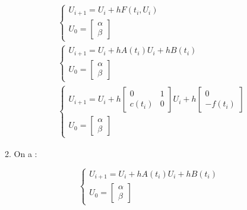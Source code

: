 \documentclass[12pt, letterpaper]{article}
\begin{document}
\begin{enumerate}
\begin{enumerate}
    \begin{equation*}
      \begin{split}
        &
        \left\{
        \begin{array}{l}
          U_{i+1} = U_i + h F(t_i, U_i) \\
          U_0 =
          \left[
            \begin{array}{l}
              \alpha \\
              \beta
            \end{array}
            \right]
        \end{array}
        \right.
        \\
        &
        \left\{
        \begin{array}{l}
          U_{i+1} = U_i + h A(t_i) U_i + h B(t_i) \\
          U_0 =
          \left[
            \begin{array}{l}
              \alpha \\
              \beta
            \end{array}
            \right]
        \end{array}
        \right.
        \\
        &
        \left\{
        \begin{array}{l}
          U_{i+1} = U_i + h
          \left[
            \begin{array}{ll}
              0 & 1 \\
              c(t_i) & 0
            \end{array}
            \right]
          U_i + h
          \left[
            \begin{array}{l}
              0 \\
              - f(t_i)
            \end{array}
            \right] \\
          U_0 =
          \left[
            \begin{array}{l}
              \alpha \\
              \beta
            \end{array}
            \right]
        \end{array}
        \right.
      \end{split}
    \end{equation*}

  \item
    On a :

    \begin{equation*}
      \left\{
      \begin{array}{l}
        U_{i+1} = U_i + h A(t_i) U_i + h B(t_i) \\
        U_0 =
        \left[
          \begin{array}{l}
            \alpha \\
            \beta
          \end{array}
          \right]
      \end{array}
      \right.
    \end{equation*}


\end{enumerate}
\end{enumerate}
\end{document}
